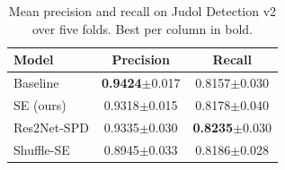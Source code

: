 \begin{table}[t]
\caption{Mean precision and recall on Judol Detection v2 over five folds. Best per column in bold.}
\label{tab:pr}
\centering\footnotesize\renewcommand{\arraystretch}{1.3}
\begin{tabular}{@{}lcc@{}}
\toprule
\textbf{Model} & \textbf{Precision} & \textbf{Recall} \\
\midrule
Baseline & \textbf{0.9424}$\pm$0.017 & 0.8157$\pm$0.030 \\
SE (ours) & 0.9318$\pm$0.015 & 0.8178$\pm$0.040 \\
Res2Net-SPD & 0.9335$\pm$0.030 & \textbf{0.8235}$\pm$0.030 \\
Shuffle-SE & 0.8945$\pm$0.033 & 0.8186$\pm$0.028 \\
\bottomrule
\end{tabular}
\end{table}

